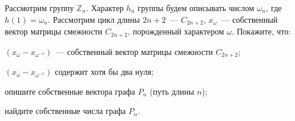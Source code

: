 Рассмотрим группу $\mathbb{Z}_n$. Характер $h_n$ группы будем описывать числом $\omega_n$, где $h(1) = \omega_n$. Рассмотрим
цикл длины $2n + 2$~--- $C_{2n +  2}$, $x_{\omega}$~--- собственный вектор матрицы смежности $C_{2n + 2}$, порожденный
характером $\omega$. Покажите, что:

\begin{enumcyr}
    \item $(x_{\omega} - x_{\omega^{-1}})$~--- собственный вектор матрицы смежности $C_{2n + 2}$;
    \item $(x_{\omega} - x_{\omega^{-1}})$ содержит хотя бы два нуля;
    \item опишите собственные вектора графа $P_n$ (путь длины $n$);
    \item найдите собственные числа графа $P_n$.
\end{enumcyr}
